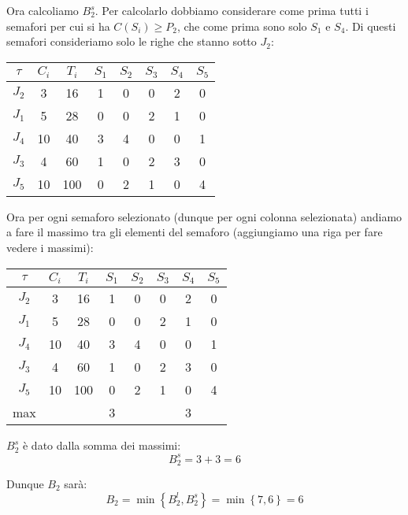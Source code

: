 \begin{Esercizio2}
Ora calcoliamo \(B_{2}^{s}\). Per calcolarlo dobbiamo
considerare come prima tutti i semafori per cui si ha 
\(C(S_{i}) \ge P_{2}\), che come prima sono solo
 \(S_{1}\) e \(S_{4}\). Di questi semafori 
 consideriamo solo le righe che stanno sotto \(J_{2}\):


\begin{table}[h]
\centering
\begin{tabular}{|c|c|c|c|c|c|c|c|}
\hline
\(\tau\) & $C_i$ & $T_i$ & $S_1$ & $S_2$ & $S_3$ & $S_4$ & $S_5$ \\
\hline
$J_2$ & 3 & 16 & 1 & 0 & 0 &2 & 0 \\
\arrayrulecolor{red}\hline
\arrayrulecolor{black}
$J_1$ & 5 & 28 & \cellcolor{blue!20}0 & 0 & 2 & \cellcolor{blue!20}1 & 0 \\
\hline
$J_4$ & 10 & 40 & \cellcolor{blue!20}3 & 4 & 0 & \cellcolor{blue!20}0 & 1 \\
\hline
$J_3$ & 4 & 60 & \cellcolor{blue!20}1 & 0 & 2 & \cellcolor{blue!20}3 & 0 \\
\hline
$J_5$ & 10 & 100 & \cellcolor{blue!20}0 & 2 & 1 & \cellcolor{blue!20}0 & 4 \\
\hline
\end{tabular}
\label{tab:task_periodici_esercizio}
\end{table}
Ora per ogni semaforo selezionato (dunque per ogni colonna
selezionata)
andiamo a fare il massimo tra gli elementi del semaforo
(aggiungiamo una riga per fare vedere i massimi):


\begin{table}[h]
\centering
\begin{tabular}{|c|c|c|c|c|c|c|c|}
\hline
\(\tau\) & $C_i$ & $T_i$ & $S_1$ & $S_2$ & $S_3$ & $S_4$ & $S_5$ \\
\hline
$J_2$ & 3 & 16 & 1 & 0 & 0 & 2 & 0 \\
\arrayrulecolor{red}\hline
\arrayrulecolor{black}
$J_1$ & 5 & 28 & \cellcolor{blue!20}0 & 0 & 2 & \cellcolor{blue!20}1 & 0 \\
\hline
$J_4$ & 10 & 40 & \cellcolor{blue!20}3 & 4 & 0 & \cellcolor{blue!20}0 & 1 \\
\hline
$J_3$ & 4 & 60 & \cellcolor{blue!20}1 & 0 & 2 & \cellcolor{blue!20}3 & 0 \\
\hline
$J_5$ & 10 & 100 & \cellcolor{blue!20}0 & 2 & 1 & \cellcolor{blue!20}0 & 4 \\
\hline
max & & & 3 & & & 3 & \\
\hline
\end{tabular}
\label{tab:task_periodici_esercizio}
\end{table}

\(B_{2}^{s}\) è dato dalla somma dei massimi:
\[ B_{2}^{s} = 3 + 3 = 6 \]

Dunque \(B_{2}\) sarà:
\[ B_{2} = \min \left\{B_{2}^{l} , B_{2}^{s}\right\} =
 \min \left\{7 , 6\right\} = 6 \]

\end{Esercizio2}




